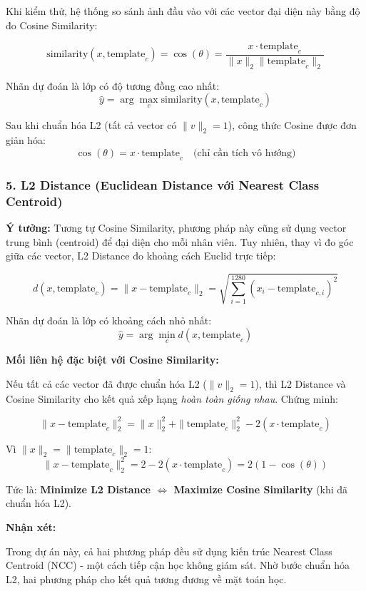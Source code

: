 \documentclass[a4paper]{book}
\begin{document}
Khi kiểm thử, hệ thống so sánh ảnh đầu vào với các vector đại diện này bằng độ đo Cosine Similarity:

\[
\text{similarity}(x, \text{template}_c) = \cos(\theta) = \frac{x \cdot \text{template}_c}{\|x\|_2 \|\text{template}_c\|_2}
\]

Nhãn dự đoán là lớp có độ tương đồng cao nhất:
\[
\hat{y} = \arg\max_c \text{similarity}(x, \text{template}_c)
\]

Sau khi chuẩn hóa L2 (tất cả vector có $\|v\|_2 = 1$), công thức Cosine được đơn giản hóa:
\[
\cos(\theta) = x \cdot \text{template}_c \quad \text{(chỉ cần tích vô hướng)}
\]

\subsubsection{5. L2 Distance (Euclidean Distance với Nearest Class Centroid)}

\textbf{Ý tưởng:} Tương tự Cosine Similarity, phương pháp này cũng sử dụng vector trung bình (centroid) để đại diện cho mỗi nhân viên. Tuy nhiên, thay vì đo góc giữa các vector, L2 Distance đo khoảng cách Euclid trực tiếp:

\[
d(x, \text{template}_c) = \|x - \text{template}_c\|_2 = \sqrt{\sum_{i=1}^{1280} (x_i - \text{template}_{c,i})^2}
\]

Nhãn dự đoán là lớp có khoảng cách nhỏ nhất:
\[
\hat{y} = \arg\min_c d(x, \text{template}_c)
\]

\textbf{Mối liên hệ đặc biệt với Cosine Similarity:}

Nếu tất cả các vector đã được chuẩn hóa L2 ($\|v\|_2 = 1$), thì L2 Distance và Cosine Similarity cho kết quả xếp hạng \textit{hoàn toàn giống nhau}. Chứng minh:

\[
\|x - \text{template}_c\|_2^2 = \|x\|_2^2 + \|\text{template}_c\|_2^2 - 2(x \cdot \text{template}_c)
\]

Vì $\|x\|_2 = \|\text{template}_c\|_2 = 1$:
\[
\|x - \text{template}_c\|_2^2 = 2 - 2(x \cdot \text{template}_c) = 2(1 - \cos(\theta))
\]

Tức là: \textbf{Minimize L2 Distance $\Leftrightarrow$ Maximize Cosine Similarity} (khi đã chuẩn hóa L2).

\textbf{Nhận xét:}

Trong dự án này, cả hai phương pháp đều sử dụng kiến trúc Nearest Class Centroid (NCC) - một cách tiếp cận học không giám sát. Nhờ bước chuẩn hóa L2, hai phương pháp cho kết quả tương đương về mặt toán học.
\end{document}
